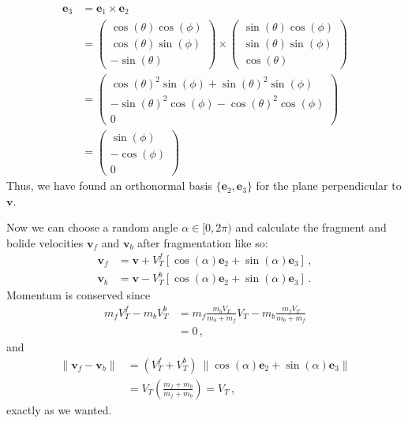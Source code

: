 \begin{align*}
    \pmb{e}_3 &= \pmb{e}_1 \times \pmb{e}_2 \\
    &= \begin{pmatrix}
        \cos(\theta)\cos(\phi) \\
        \cos(\theta)\sin(\phi) \\
        -\sin(\theta)
    \end{pmatrix} \times \begin{pmatrix}
        \sin(\theta)\cos(\phi) \\
        \sin(\theta)\sin(\phi) \\
        \cos(\theta)
    \end{pmatrix} \\
    &= \begin{pmatrix}
        \cos(\theta)^2\sin(\phi) + \sin(\theta)^2\sin(\phi) \\
        -\sin(\theta)^2\cos(\phi) - \cos(\theta)^2\cos(\phi) \\
        0
    \end{pmatrix} \\
    &= \begin{pmatrix}
        \sin(\phi) \\
        -\cos(\phi) \\
        0
    \end{pmatrix}
\end{align*}
Thus, we have found an orthonormal basis $\{\pmb{e}_2, \pmb{e}_3\}$ for the plane perpendicular to $\pmb{v}$.

Now we can choose a random angle $\alpha \in [0, 2\pi)$ and calculate the fragment and bolide velocities $\pmb{v}_f$ and $\pmb{v}_b$ after fragmentation like so:
\begin{align}
    \pmb{v}_f &= \pmb{v} + V_T^f[\cos(\alpha)\pmb{e}_2 + \sin(\alpha)\pmb{e}_3]\,,\\
    \pmb{v}_b &= \pmb{v} - V_T^b[\cos(\alpha)\pmb{e}_2 + \sin(\alpha)\pmb{e}_3]\,.
\end{align}
Momentum is conserved since
\begin{align*}
    m_f V_T^f - m_b V_T^b &= m_f\frac{m_b V_T}{m_b + m_f}V_T - m_b\frac{m_f V_T}{m_b + m_f} \\
    &= 0\,,
\end{align*}
and 
\begin{align*}
    \|\pmb{v}_f - \pmb{v}_b\| &= (V_T^f + V_T^b)\ \|\cos(\alpha)\pmb{e}_2 + \sin(\alpha)\pmb{e}_3\| \\
    &= V_T \left(\frac{m_f + m_b}{m_f + m_b}\right) = V_T\,,
\end{align*}
exactly as we wanted.
